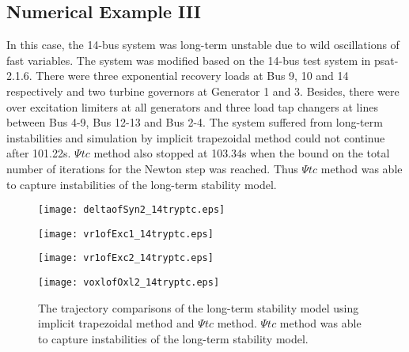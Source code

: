 \documentclass[journal]{IEEEtran}
\begin{document}
\subsection{Numerical Example III}
In this case, the 14-bus system was long-term unstable due to wild oscillations of fast variables. The system was modified based on the 14-bus test system in psat-2.1.6\cite{Milano:article}. There were three exponential recovery loads at Bus 9, 10 and 14 respectively and two turbine governors at Generator 1 and 3. Besides, there were over excitation limiters at all generators and three load tap changers at lines between Bus 4-9, Bus 12-13 and Bus 2-4. 
The system suffered from long-term instabilities and simulation by implicit trapezoidal method could not continue after 101.22s. $\Psi tc$ method also stopped at 103.34s when the bound on the total number of iterations for the Newton step was reached. Thus $\Psi tc$ method was able to capture instabilities of the long-term stability model.
\begin{figure}[!ht]
\centering
\begin{minipage}[t]{0.5\linewidth}
\texttt{[image: deltaofSyn2\_14tryptc.eps]}
\end{minipage}\begin{minipage}[t]{0.5\linewidth}
\texttt{[image: vr1ofExc1\_14tryptc.eps]}
\end{minipage}
\begin{minipage}[t]{0.5\linewidth}
\texttt{[image: vr1ofExc2\_14tryptc.eps]}
\end{minipage}\begin{minipage}[t]{0.5\linewidth}
\texttt{[image: voxlofOxl2\_14tryptc.eps]}
\end{minipage}
\caption{The trajectory comparisons of the long-term stability model using implicit trapezoidal method and $\Psi tc$ method. $\Psi tc$ method was able to capture instabilities of the long-term stability model.}\label{my14completeqss_try}
\end{figure}
\end{document}
